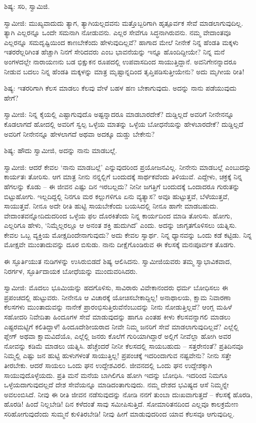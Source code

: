ಶಿಷ್ಯ: ಸರಿ, ಸ್ವಾಮಿಜಿ.

ಸ್ವಾಮೀಜಿ: ಮುಖ್ಯವಾದುದು ತ್ಯಾಗ, ತ್ಯಾಗಿಯಲ್ಲದವನು ಮತ್ತೊಬ್ಬರಿಗಾಗಿ ಹೃತ್ಪೂರ್ವಕ ಸೇವೆ ಮಾಡಲಾಗುವುದಿಲ್ಲ. ತ್ಯಾಗಿ ಎಲ್ಲರನ್ನೂ ಒಂದೇ ಸಮನಾಗಿ ನೋಡುವನು. ಎಲ್ಲರ ಸೇವೆಗೂ ಸಿದ್ಧನಾಗಿರುವನು. ನಮ್ಮ ವೇದಾಂತವೂ ಎಲ್ಲರನ್ನೂ ಸಮದೃಷ್ಟಿಯಿಂದ ಕಾಣಬೇಕೆಂದು ಹೇಳುವುದಿಲ್ಲವೆ? ಹಾಗಾದ ಮೇಲೆ ನೀನೇಕೆ ನಿನ್ನ ಹೆಂಡತಿ ಮಕ್ಕಳು ಇತರರೆಲ್ಲರಿಗಿಂತ ಹೆಚ್ಚಾಗಿ ನಿನಗೆ ಸೇರಿದವರು ಎಂಬ ಭಾವನೆಯನ್ನು ಇನ್ನೂ ಹೊಂದಿದ್ದೀಯೇ? ನಿನ್ನ ಮನೆ ಅಂಗಳದಲ್ಲೇ ನಾರಾಯಣನು ಬಡ ಭಿಕ್ಷುಕನ ರೂಪದಲ್ಲಿ ಉಪವಾಸದಿಂದ ಸಾಯುತ್ತಿದ್ದಾನೆ. ಅವನಿಗೇನನ್ನಾದರೂ ನೀಡುವ ಬದಲು ನಿನ್ನ ಹೆಂಡತಿ ಮಕ್ಕಳನ್ನು ಮಾತ್ರ ಮೃಷ್ಟಾನ್ನದಿಂದ ತೃಪ್ತಿಪಡಿಸುತ್ತೀಯೇನು? ಅದು ಮೃಗೀಯ ರೀತಿ!

ಶಿಷ್ಯ: ಇತರರಿಗಾಗಿ ಕೆಲಸ ಮಾಡಲು ಕೆಲವು ವೇಳೆ ಬಹಳ ಹಣ ಬೇಕಾಗುವುದು. ಅದನ್ನು ನಾನು ಪಡೆಯುವುದು ಹೇಗೆ?

ಸ್ವಾಮೀಜಿ: ನಿನ್ನ ಕೈಯಲ್ಲಿ ಎಷ್ಟಾಗುವುದೊ ಅಷ್ಟನ್ನಾದರೂ ಮಾಡಬಾರದೇಕೆ? ದುಡ್ಡಿಲ್ಲದೆ ಅವರಿಗೆ ನೀನೇನನ್ನೂ ಕೊಡಲಾಗದೆ ಹೋದಲ್ಲಿ ಅವರಿಗೆ ಸ್ವಲ್ಪ ಒಳ್ಳೆಯ ಮಾತನ್ನು ಒಳ್ಳೆಯ ಬೋಧನೆಯನ್ನು ಹೇಳಬಾರದೇಕೆ? ದುಡ್ಡಿಲ್ಲದೆ ಅವರಿಗೆ ನೀನೇನನ್ನೂ ಹೇಳಲಾಗದೆ ಅಥವಾ ಅದಕ್ಕೂ ದುಡ್ಡು ಬೇಕೇನು?

ಶಿಷ್ಯ: ಹೌದು ಸ್ವಾಮೀಜಿ, ಅದನ್ನು ನಾನು ಮಾಡಬಲ್ಲೆ.

ಸ್ವಾಮೀಜಿ: ಆದರೆ ಕೇವಲ ‘ನಾನು ಮಾಡಬಲ್ಲೆ’ ಎನ್ನುವುದರಿಂದ ಪ್ರಯೋಜನವಿಲ್ಲ. ನೀನೇನು ಮಾಡಬಲ್ಲೆ ಎಂಬುದನ್ನು ಕಾರ್ಯತಃ ತೋರಿಸು. ಆಗ ಮಾತ್ರ ನೀನು ನನ್ನಲ್ಲಿಗೆ ಬಂದುದಕ್ಕೆ ಸಾರ್ಥಕವೆಂದು ತಿಳಿಯುವೆ. ಎದ್ದೇಳು, ಚಕ್ರಕ್ಕೆ ನಿನ್ನ ಹೆಗಲನ್ನು ಕೊಡು – ಈ ಜೀವನ ಎಷ್ಟು ದಿನ ಇರಬಲ್ಲದು? ನೀನೀ ಜಗತ್ತಿಗೆ ಬಂದುದಕ್ಕೆ ಒಂದಾದರೂ ಗುರುತನ್ನು ಬಿಟ್ಟುಹೋಗು. ಇಲ್ಲದಿದ್ದಲ್ಲಿ ನಿನಗೂ ಮರ ಕಲ್ಲುಗಳಿಗೂ ಏನು ವ್ಯತ್ಯಾಸ? ಅವೂ ಹುಟ್ಟುತ್ತವೆ, ಬೆಳೆಯುತ್ತವೆ, ಸಾಯುತ್ತವೆ. ನೀನೂ ಅದೇ ರೀತಿ ಹುಟ್ಟಿ ಸಾಯಬೇಕೆಂದು ಬಯಸಿದಲ್ಲಿ ನೀನೂ ಹಾಗೇ ಮಾಡಬಹುದು. ವೇದಾಂತವನ್ನೋದಿದುದರಿಂದ ಒಳ್ಳೆಯ ಫಲ ದೊರಕಿತೆಂದು ನಿನ್ನ ಕಾರ್ಯದಿಂದ ಮಾಡಿ ತೋರಿಸು. ಹೋಗು, ಎಲ್ಲರಿಗೂ ಹೇಳು, ‘ನಿಮ್ಮೆಲ್ಲರಲ್ಲೂ ಆ ಅನಂತ ಶಕ್ತಿ ಹುದುಗಿದೆ’ ಎಂದು. ಅದನ್ನು ಜಾಗೃತಗೊಳಿಸಲು ಯತ್ನಿಸು. ಕೇವಲ ಒಬ್ಬ ವ್ಯಕ್ತಿಯ ಮೋಕ್ಷದಿಂದೇನಾಗುವುದು? ಅದು ಕೇವಲ ಸ್ವಾರ್ಥ. ನಿನ್ನ ಧ್ಯಾನವನ್ನು ಒಂದು ಕಡೆ ಕಟ್ಟಿಡು. ನಿನ್ನ ಮೋಕ್ಷವೇ ಮುಂತಾದುವನ್ನು ದೂರ ಬಿಸುಡು. ನಾನು ದೀಕ್ಷೆಗೊಂಡಿರುವ ಈ ಕೆಲಸಕ್ಕೆ ಮನಃಪೂರ್ವಕ ತೊಡಗು.

ಈ ಸ್ಫೂರ್ತಿಯುತ ನುಡಿಗಳನ್ನು ಉಸಿರುಬಿಡದೆ ಶಿಷ್ಯ ಆಲಿಸಿದನು. ಸ್ವಾಮೀಜಿಯವರು ತಮ್ಮ ಸ್ವಾಭಾವಿಕವಾದ, ನಿರರ್ಗಳ, ಸ್ಫೂರ್ತಿದಾಯಕ ಬೋಧೆಯನ್ನು ಮುಂದುವರಿಸಿದರು.

ಸ್ವಾಮೀಜಿ: ಮೊದಲು ಭೂಮಿಯನ್ನು ಹದಗೊಳಿಸು, ಸಾವಿರಾರು ವಿವೇಕಾನಂದರು ಧರ್ಮ ಬೋಧಿಸಲು ಈ ಪ್ರಪಂಚದಲ್ಲಿ ಹುಟ್ಟುವರು. ನೀನೇನೂ ಆ ವಿಚಾರಕ್ಕೆ ಯೋಚಿಸಬೇಕಾದ್ದಿಲ್ಲ! ಅನಾಥಾಲಯ, ಕ್ಷಾಮ ನಿವಾರಣಾ ಕೆಲಸಗಳು ಮುಂತಾದುವನ್ನು ನಾನೇಕೆ ಪ್ರಾರಂಭಿಸುತ್ತಿರುವೆನೆಂಬುದನ್ನು ನೀನು ನೋಡುತ್ತಿಲ್ಲವೆ? ಆಂಗ್ಲ ಮಹಿಳೆ ಸಹೋದರಿ ನಿವೇದಿತಾ ಹಿಂದೂಗಳ ಸೇವೆ ಮಾಡುವುದನ್ನು ಹಾಗೂ ಎಂತಹ ಕೀಳು ಕೆಲಸವನ್ನಾಗಲಿ ಮಾಡಲು ಎಷ್ಟರಮಟ್ಟಿಗೆ ಕಲಿತಿದ್ದಾಳೆ! ಹಿಂದೂದೇಶೀಯರಾದ ನೀವೇ ನಿಮ್ಮ ಜನರಿಗೆ ಸೇವೆ ಮಾಡಲಾಗುವುದಿಲ್ಲವೆ? ಎಲ್ಲೆಲ್ಲಿ ಪ್ಲೇಗ್ ಅಥವಾ ಕ್ಷಾಮವಿದೆಯೊ, ಎಲ್ಲೆಲ್ಲಿ ಜನರು ಕೊಲೆಗೆ ಗುರಿಯಾಗಿದ್ದಾರೆ ಅಲ್ಲಿಗೆ ನೀವೆಲ್ಲಾ ಹೋಗಿ ಅವರ ನೋವನ್ನು ಕಡಿಮೆ ಮಾಡಲು ಯತ್ನಿಸಿ. ಹೆಚ್ಚೆಂದರೆ ನೀನೀ ಕೆಲಸದಲ್ಲಿ ಸಾಯಬಹುದು – ಸತ್ತರೇನಂತೆ? ಪ್ರತಿದಿನವೂ ನಿಮ್ಮಲ್ಲಿ ಎಷ್ಟು ಜನ ಹುಟ್ಟಿ ಹುಳುಗಳಂತೆ ಸಾಯುತ್ತಿಲ್ಲ! ಪ್ರಪಂಚಕ್ಕೆ ಇದರಿಂದಾಗುವ ನಷ್ಟವೇನು? ನೀನು ಸತ್ತೇ ತೀರಬೇಕು. ಆದರೆ ಸಾಯಲು ಒಂದು ಘನ ಉದ್ದೇಶವಿರಲಿ. ಜೀವನದಲ್ಲಿ ಒಂದು ಘನ ಉದ್ದೇಶಕ್ಕಾಗಿ ಸಾಯುವುದೊಳ್ಳೆಯದು. ಪ್ರತಿ ಮನೆ ಮನೆಯ ಬಾಗಿಲಿಗೂ ಹೋಗಿ ಇದನ್ನು ಬೋಧಿಸಿ. ಇದರಿಂದ ನಿಮಗೂ ಒಳ್ಳೆಯದಾಗುವುದಲ್ಲದೆ ದೇಶ ಸೇವೆಯನ್ನೂ ಮಾಡಿದಂತಾಗುವುದು. ನಮ್ಮ ದೇಶದ ಭವಿಷ್ಯದ ಆಸೆ ನಿಮ್ಮನ್ನೇ ಅವಲಂಬಿಸಿದೆ. ನೀವು ಈ ರೀತಿ ಜೀವನ ನಡೆಸುವುದನ್ನು ನೋಡಿ ನನಗೆ ತುಂಬಾ ದುಃಖವಾಗುತ್ತದೆ – ಕೆಲಸಕ್ಕೆ ಹೊರಡಿ, ಹೊರಡಿ! ಹಿಂದೆ ನಿಲ್ಲಬೇಡಿ! ದಿನ ಕಳೆದಂತೆ ಸಾವು ಸಮೀಪಿಸುತ್ತಿದೆ. ಸೋಮಾರಿತನದಿಂದ ಎಲ್ಲವೂ ಕಾಲಕ್ರಮೇಣ ಸರಿಹೋಗುವುದೆಂದು ಸುಮ್ಮನೆ ಕುಳಿತಿರಬೇಡಿ! ನೀವು ಹೀಗೆ ಮಾಡುವುದರಿಂದ ಯಾವ ಕೆಲಸವೂ ಆಗುವುದಿಲ್ಲ.

